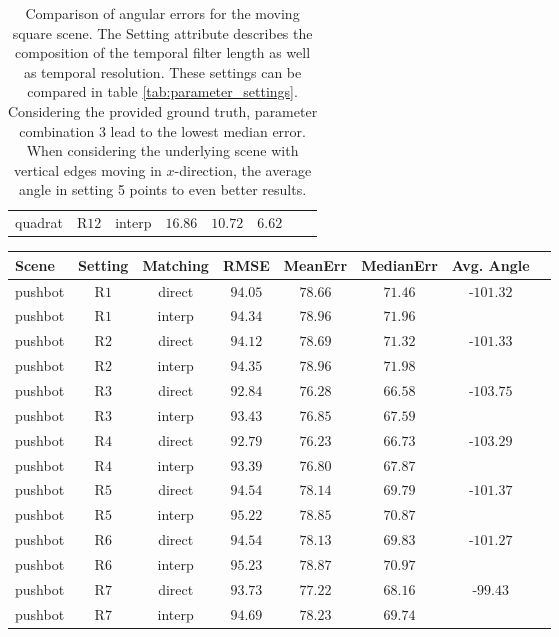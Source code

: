 \begin{appendix}
\begin{table}[tb]
\begin{tabular}{lccccccc}
quadrat & R$12$ & interp & $16.86$ & $10.72$ & $6.62$ &  & \\
		\end{tabular}
	\caption[First scene: Comparison of angular errors for different parameters.]{Comparison of angular errors for the moving square scene.
	The Setting attribute describes the composition of the temporal filter length as well as temporal resolution.
	 These settings can be compared in table \ref{tab:parameter_settings}. Considering the provided ground truth, parameter combination 3 lead to the lowest median error. When considering the underlying scene with vertical edges moving in $x$-direction, the average angle in setting 5 points to even better results.}
	\label{tab:app_error_comparison_quadrat}
	 \end{table}
	 
	 \begin{table}[tb]
	\centering
		\begin{tabular}{lccccccc}
Scene & Setting & Matching & RMSE & MeanErr & MedianErr & Avg. Angle \\
\hline  \hline
pushbot & R$1$ & direct & $94.05$ & $78.66$ & $71.46$ & -$101.32$ & \\
pushbot & R$1$ & interp & $94.34$ & $78.96$ & $71.96$ &  & \\
pushbot & R$2$ & direct & $94.12$ & $78.69$ & $71.32$ & -$101.33$ & \\
pushbot & R$2$ & interp & $94.35$ & $78.96$ & $71.98$ &  & \\
pushbot & R$3$ & direct & $92.84$ & $76.28$ & $66.58$ & -$103.75$ & \\
pushbot & R$3$ & interp & $93.43$ & $76.85$ & $67.59$ &  & \\
pushbot & R$4$ & direct & $92.79$ & $76.23$ & $66.73$ & -$103.29$ & \\
pushbot & R$4$ & interp & $93.39$ & $76.80$ & $67.87$ &  & \\
pushbot & R$5$ & direct & $94.54$ & $78.14$ & $69.79$ & -$101.37$ & \\
pushbot & R$5$ & interp & $95.22$ & $78.85$ & $70.87$ &  & \\
pushbot & R$6$ & direct & $94.54$ & $78.13$ & $69.83$ & -$101.27$ & \\
pushbot & R$6$ & interp & $95.23$ & $78.87$ & $70.97$ &  & \\
pushbot & R$7$ & direct & $93.73$ & $77.22$ & $68.16$ & -$99.43$ & \\
pushbot & R$7$ & interp & $94.69$ & $78.23$ & $69.74$ &  & \\

\end{tabular}
\end{table}
\end{appendix}
